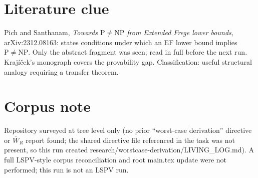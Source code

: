 \documentclass{article}
\begin{document}
\section*{Literature clue}
Pich and Santhanam, \emph{Towards $\mathrm P\ne\mathrm{NP}$ from Extended Frege lower bounds}, arXiv:2312.08163: states conditions under which an EF lower bound implies $\mathrm P\ne\mathrm{NP}$. Only the abstract fragment was seen; read in full before the next run. Krajíček's monograph covers the provability gap. Classification: useful structural analogy requiring a transfer theorem.

\section*{Corpus note}
Repository surveyed at tree level only (no prior ``worst-case derivation'' directive or $\overline W_R$ report found; the shared directive file referenced in the task was not present, so this run created research/worstcase-derivation/LIVING\_LOG.md). A full LSPV-style corpus reconciliation and root main.tex update were not performed; this run is not an LSPV run.
\end{document}
